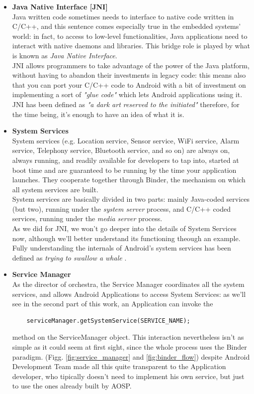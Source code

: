 \begin{itemize}
\item \textbf{Java Native Interface [JNI]}\\
Java written code sometimes needs to interface to native code written in C/C++, and this sentence comes especially true in the embedded systems' world: in fact, to access to low-level functionalities, Java applications need to interact with native daemons and libraries. This bridge role is played by what is known as \textit{Java Native Interface}.\\
JNI allows programmers to take advantage of the power of the Java platform, without having to abandon their investments in legacy code: this means also that you can port your C/C++ code to Android with a bit of investment on implementing a sort of \textit{"glue code"} which lets Android applications using it. JNI has been defined as \textit{"a dark art reserved to the initiated"} \cite{embandroid} therefore, for the time being, it's enough to have an idea of what it is.
\item \textbf{System Services}\\
System services (e.g. Location service, Sensor service, WiFi service, Alarm service, Telephony service, Bluetooth service, and so on) are always on, always running, and readily available for developers to tap into, started at boot time and are guaranteed to be running by the time your application launches. They cooperate together through Binder, the mechanism on which all system services are built.\\
System services are basically divided in two parts: mainly Java-coded services (but two), running under the \textit{system server} process, and C/C++ coded services, running under the \textit{media server} process.\\
As we did for JNI, we won't go deeper into the details of System Services now, although we'll better understand its functioning theough an example. Fully understanding the internals of Android's system services has been defined as \textit{trying to swallow a whale} \cite{embandroid}.
\item \textbf{Service Manager}\\
As the director of orchestra, the Service Manager coordinates all the system services, and allows Android Applications to access System Services: as we'll see in the second part of this work, an Application can invoke the
\begin{verbatim}
	serviceManager.getSystemService(SERVICE_NAME);
\end{verbatim} method on the ServiceManager object. This interaction nevertheless isn't as simple as it could seem at first sight, since the whole process uses the Binder paradigm. (Figg. \ref{fig:service_manager} and \ref{fig:binder_flow}) despite Android Development Team made all this quite transparent to the Application developer, who tipically doesn't need to implement his own service, but just to use the ones already built by AOSP.

\end{itemize}
